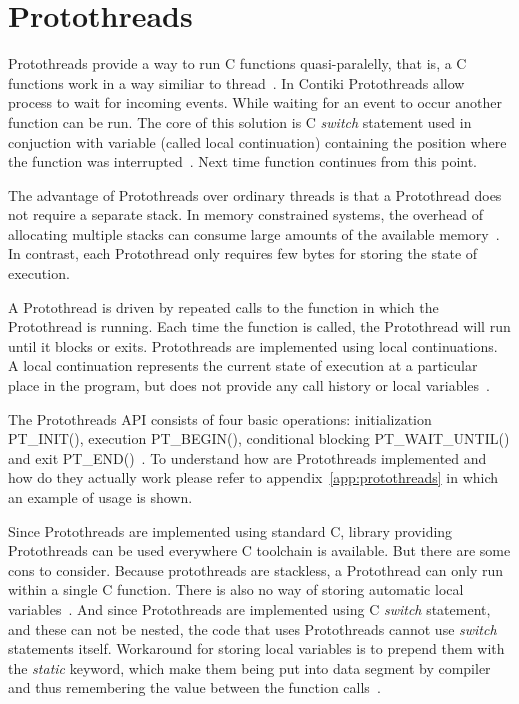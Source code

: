 
\section{Protothreads}\label{sec:contiki-protothreads}
Protothreads provide a way to run C functions quasi-paralelly,
that is, a C functions work in a way similiar to thread~\cite{paper-protothreads}.
In Contiki Protothreads allow process to wait for incoming events.
While waiting for an event to occur another function
can be run. The core of this solution is C {\it switch} statement used in conjuction with variable (called local continuation)
containing the position where the function was interrupted~\cite{paper-protothreads}.
Next time function continues from this point.

The advantage of Protothreads over ordinary threads is that a Protothread does not require a separate stack.
In memory constrained systems, the overhead of allocating multiple stacks can consume large amounts of
the available memory~\cite{paper-protothreads}.
In contrast, each Protothread only requires few bytes for storing the state of execution.

A Protothread is driven by repeated calls to the function in which the Protothread is running.
Each time the
function is called, the Protothread will run until it blocks or exits.
Protothreads are implemented using local continuations. A local continuation represents the current state
of execution at a particular place in the program, but does not provide any call history or local variables~\cite{contiki-docs}.

The Protothreads API consists of four basic operations: initialization PT\_INIT(), execution PT\_BEGIN(),
conditional blocking PT\_WAIT\_UNTIL() and exit PT\_END()~\cite{paper-protothreads}.
To understand how are Protothreads implemented and how do they actually work please refer
to appendix~\ref{app:protothreads} in which an example of usage is shown.

Since Protothreads are implemented using standard C, library providing Protothreads can be used everywhere C toolchain is available.
But there are some cons to consider. Because protothreads are stackless, a Protothread can only run within a single C function.
There is also no way of storing automatic local variables~\cite{contiki-docs}. And since Protothreads are implemented using C {\it switch} statement, and these can
not be nested, the code that uses Protothreads cannot use {\it switch} statements itself.
Workaround for storing local variables is to prepend them with the {\it static} keyword, which make them being put into data segment
by compiler and thus remembering the value between the function calls~\cite{paper-protothreads}.

